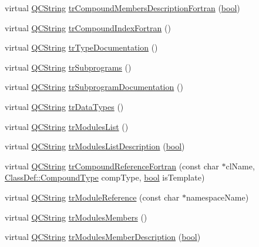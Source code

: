 \begin{DoxyCompactItemize}
\item 
virtual \hyperlink{class_q_c_string}{Q\+C\+String} \hyperlink{class_translator_persian_a9a535268af1d6ed8279fc6011a03c8bf}{tr\+Compound\+Members\+Description\+Fortran} (\hyperlink{qglobal_8h_a1062901a7428fdd9c7f180f5e01ea056}{bool})
\item 
virtual \hyperlink{class_q_c_string}{Q\+C\+String} \hyperlink{class_translator_persian_a3d25b819fccf3b163af85f46cb024939}{tr\+Compound\+Index\+Fortran} ()
\item 
virtual \hyperlink{class_q_c_string}{Q\+C\+String} \hyperlink{class_translator_persian_a35b3a955ce79b76af01b8f4bdf6a971f}{tr\+Type\+Documentation} ()
\item 
virtual \hyperlink{class_q_c_string}{Q\+C\+String} \hyperlink{class_translator_persian_a3ffef49639f759ede302bc316ca0bafa}{tr\+Subprograms} ()
\item 
virtual \hyperlink{class_q_c_string}{Q\+C\+String} \hyperlink{class_translator_persian_a7c6c3e03c1c7d985a9ee1ba0a5efa719}{tr\+Subprogram\+Documentation} ()
\item 
virtual \hyperlink{class_q_c_string}{Q\+C\+String} \hyperlink{class_translator_persian_aa2e3546529d921587ea817b48e1a9604}{tr\+Data\+Types} ()
\item 
virtual \hyperlink{class_q_c_string}{Q\+C\+String} \hyperlink{class_translator_persian_afd9648acb0b50c362968dae4a5a9a4fa}{tr\+Modules\+List} ()
\item 
virtual \hyperlink{class_q_c_string}{Q\+C\+String} \hyperlink{class_translator_persian_af5c8699a8b0145943768b40867049c1d}{tr\+Modules\+List\+Description} (\hyperlink{qglobal_8h_a1062901a7428fdd9c7f180f5e01ea056}{bool})
\item 
virtual \hyperlink{class_q_c_string}{Q\+C\+String} \hyperlink{class_translator_persian_a00ceb20bf1128a90d2e57f9cc3351181}{tr\+Compound\+Reference\+Fortran} (const char $\ast$cl\+Name, \hyperlink{class_class_def_ae70cf86d35fe954a94c566fbcfc87939}{Class\+Def\+::\+Compound\+Type} comp\+Type, \hyperlink{qglobal_8h_a1062901a7428fdd9c7f180f5e01ea056}{bool} is\+Template)
\item 
virtual \hyperlink{class_q_c_string}{Q\+C\+String} \hyperlink{class_translator_persian_ae74202e285172d8f1c8cabadc07a338a}{tr\+Module\+Reference} (const char $\ast$namespace\+Name)
\item 
virtual \hyperlink{class_q_c_string}{Q\+C\+String} \hyperlink{class_translator_persian_a77a9115ca4a5c9f88c4f08692a365fb9}{tr\+Modules\+Members} ()
\item 
virtual \hyperlink{class_q_c_string}{Q\+C\+String} \hyperlink{class_translator_persian_a7657ea35e8614f527f2fca992d09c321}{tr\+Modules\+Member\+Description} (\hyperlink{qglobal_8h_a1062901a7428fdd9c7f180f5e01ea056}{bool})

\end{DoxyCompactItemize}
